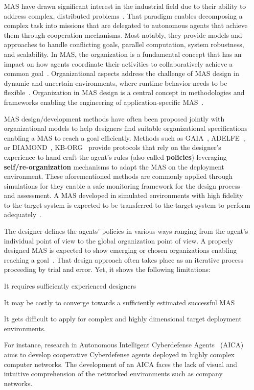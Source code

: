 \documentclass[runningheads]{llncs}
\begin{document}
MAS have drawn significant interest in the industrial field due to their ability to address complex, distributed problems~\cite{Raileanu2023}.
That paradigm enables decomposing a complex task into missions that are delegated to autonomous agents that achieve them through cooperation mechanisms. Most notably, they provide models and approaches to handle conflicting goals, parallel computation, system robustness, and scalability.
In MAS, the organization is a fundamental concept that has an impact on how agents coordinate their activities to collaboratively achieve a common goal~\cite{Hubner2007}.
Organizational aspects address the challenge of MAS design in dynamic and uncertain environments, where runtime behavior needs to be flexible~\cite{Kathleen2020}. Organization in MAS design is a central concept in methodologies and frameworks enabling the engineering of application-specific MAS~\cite{Bakliwal2018}.

MAS design/development methods have often been proposed jointly with organizational models to help designers find suitable organizational specifications enabling a MAS to reach a goal efficiently. Methods such as GAIA~\cite{Wooldridge2000,Cernuzzi2014}, ADELFE~\cite{Mefteh2015}, or DIAMOND~\cite{Jamont2015}, KB-ORG~\cite{Sims2008} provide protocols that rely on the designer's experience to hand-craft the agent's rules (also called \textbf{policies}) leveraging \textbf{self/re-organization} mechanisms to adapt the MAS on the deployment environment.
These aforementioned methods are commonly applied through simulations for they enable a safe monitoring framework for the design process and assessment. A MAS developed in simulated environments with high fidelity to the target system is expected to be transferred to the target system to perform adequately~\cite{Schon2021}.

The designer defines the agents' policies in various ways ranging from the agent's individual point of view to the global organization point of view. A properly designed MAS is expected to show emerging or chosen organizations enabling reaching a goal~\cite{Picard2009}. That design approach often takes place as an iterative process proceeding by trial and error. Yet, it shows the following limitations:
\begin{enumerate*}[label=\roman*),itemjoin={;\quad}]
    \item It requires sufficiently experienced designers
    \item It may be costly to converge towards a sufficiently estimated successful MAS
    \item It gets difficult to apply for complex and highly dimensional target deployment environments.
\end{enumerate*}
For instance, research in Autonomous Intelligent Cyberdefense Agents~\cite{Kott2023} (AICA) aims to develop cooperative Cyberdefense agents deployed in highly complex computer networks. The development of an AICA faces the lack of visual and intuitive comprehension of the networked environments such as company networks.
\end{document}
